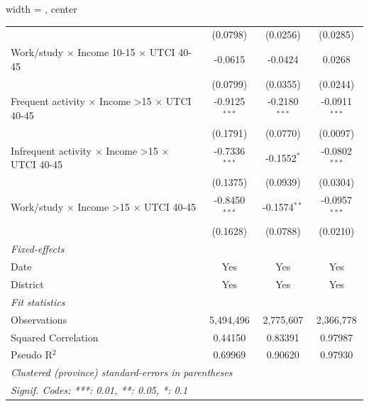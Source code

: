\begin{table}[htbp]
\begin{adjustbox}{width = \textwidth, center}
\begin{tabular}{lccc}
                                                                         & (0.0798)                  & (0.0256)                & (0.0285)\\   
         Work/study $\times$ Income 10-15 $\times$ UTCI 40-45            & -0.0615                   & -0.0424                 & 0.0268\\   
                                                                         & (0.0799)                  & (0.0355)                & (0.0244)\\   
         Frequent activity $\times$ Income >15 $\times$ UTCI 40-45       & -0.9125$^{***}$           & -0.2180$^{***}$         & -0.0911$^{***}$\\   
                                                                         & (0.1791)                  & (0.0770)                & (0.0097)\\   
         Infrequent activity $\times$ Income >15 $\times$ UTCI 40-45     & -0.7336$^{***}$           & -0.1552$^{*}$           & -0.0802$^{***}$\\   
                                                                         & (0.1375)                  & (0.0939)                & (0.0304)\\   
         Work/study $\times$ Income >15 $\times$ UTCI 40-45              & -0.8450$^{***}$           & -0.1574$^{**}$          & -0.0957$^{***}$\\   
                                                                         & (0.1628)                  & (0.0788)                & (0.0210)\\   
         \midrule
         \emph{Fixed-effects}\\
         Date                                                            & Yes                       & Yes                     & Yes\\  
         District                                                        & Yes                       & Yes                     & Yes\\  
         \midrule
         \emph{Fit statistics}\\
         Observations                                                    & 5,494,496                 & 2,775,607               & 2,366,778\\  
         Squared Correlation                                             & 0.44150                   & 0.83391                 & 0.97987\\  
         Pseudo R$^2$                                                    & 0.69969                   & 0.90620                 & 0.97930\\  
         \midrule \midrule
         \multicolumn{4}{l}{\emph{Clustered (province) standard-errors in parentheses}}\\
         \multicolumn{4}{l}{\emph{Signif. Codes: ***: 0.01, **: 0.05, *: 0.1}}\\
      \end{tabular}
   \end{adjustbox}
\end{table}


